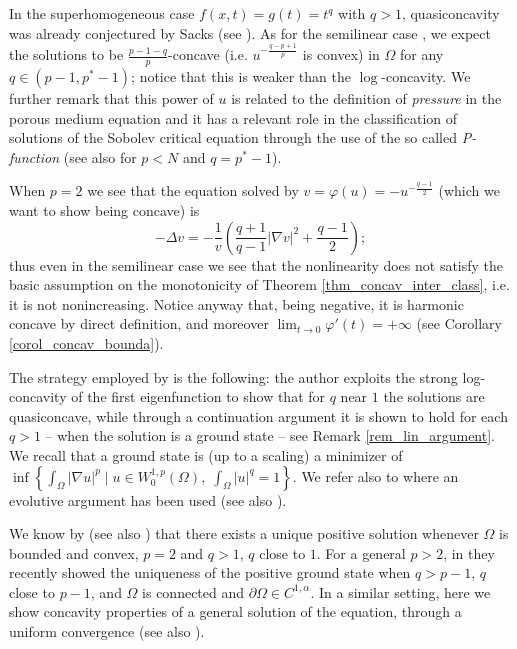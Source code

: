 \documentclass[11pt, reqno]{amsart}
\theoremstyle{definition}
\numberwithin{equation}{section}
\begin{document}
In the superhomogeneous case $f(x,t)= g(t)=t^q$ with $q>1$, quasiconcavity was already conjectured by Sacks (see \cite[Remark 9]{Kaw85W}). 
As for the semilinear case \cite{Lin94,LeVa08}, we expect the solutions to be $\frac{p-1-q}{p}$-concave (i.e. $u^{-\frac{q-p+1}{p}}$ is convex) in $\Omega$ for any $q \in (p-1, p^*-1)$; notice that this is weaker than the $\log$-concavity. 
We further remark that this power of $u$ is related to the definition of \emph{pressure} in the porous medium equation \cite{LeVa08} and it has a relevant role in the classification of solutions of the Sobolev critical equation through the use of the so called \emph{P-function}
\cite{CFP24}
(see also \cite{SeZo02,CFR20} for $p<N$ and $q=p^*-1$).

When $p=2$ we see that the equation solved by $v=\varphi(u)=-u^{-\frac{q-1}{2}}$ (which we want to show being concave) is
$$- \Delta v = - \frac{1}{v}\left(\frac{q+1}{q-1} |\nabla v|^2 + \frac{q-1}{2}\right);$$
thus even in the semilinear case we see that the nonlinearity does not satisfy the basic assumption on the monotonicity of Theorem \ref{thm_concav_inter_class}, i.e. it is not nonincreasing. 
Notice anyway that, being negative, it is harmonic concave by direct definition, and moreover $\lim_{t\to 0} \varphi'(t) = +\infty$ (see Corollary \ref{corol_concav_bounda}).

The strategy employed by \cite{Lin94} is the following: the author exploits the strong log-concavity of the first eigenfunction to show that for $q$ near $1$ the solutions are quasiconcave, while through a continuation argument it is shown to hold for each $q>1$ -- when the solution is a ground state -- see Remark \ref{rem_lin_argument}. 
We recall that a ground state is (up to a scaling) a minimizer of $\inf\left\{ \int_{\Omega} |\nabla u|^p \mid u \in W^{1,p}_0(\Omega), \; \int_{\Omega} |u|^q = 1\right\}$.
We refer also to \cite[Lemma 4.8]{LeVa08} where an evolutive argument has been used (see also \cite{Lio81, Ken88}). 


We know by \cite[Lemma 3]{Lin94} (see also \cite[Proposition 4.3]{BrFr20}) that there exists a unique positive solution whenever $\Omega$ is bounded and convex, $p=2$ and $q>1$, $q$ close to $1$.
For a general $p>2$, in \cite[Corollary 1.4]{BrLi23} they recently showed the uniqueness of the positive ground state when $q>p-1$, $q$ close to $p-1$, and $\Omega$ is connected and $\partial \Omega \in C^{1,\alpha}$. 
In a similar setting, here we show concavity properties of a general solution of the equation, through a uniform convergence (see also \cite{GrPa08}).
\end{document}
